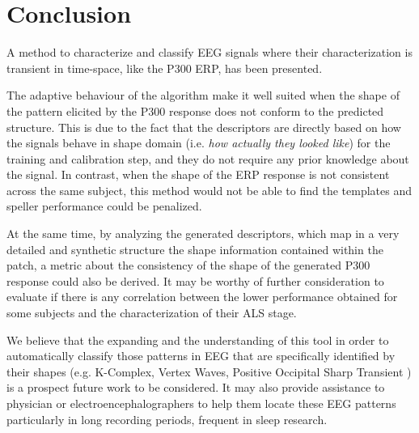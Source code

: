 \documentclass[entropy,article,submit,moreauthors,pdftex,10pt,a4paper]{mdpi}
\begin{document}
%
%
%
%
%
%
%
%

\section{Conclusion}

A method to characterize and classify EEG signals where their characterization is transient in time-space, like the P300 ERP, has been presented.   


The adaptive behaviour of the algorithm make it well suited when the shape of the pattern elicited by the P300 response does not conform to the predicted structure.  This is due to the fact that the descriptors are directly based on how the signals behave in shape domain (i.e. \textit{how actually they looked like}) for the training and calibration step, and they do not require any prior knowledge about the signal.   In contrast, when the shape of the ERP response is not consistent across the same subject, this method would not be able to find the templates and speller performance could be penalized.  

At the same time, by analyzing the generated descriptors, which map in a very detailed and synthetic structure the shape information contained within the patch, a metric about the consistency of the shape of the generated P300 response could also be derived.  It may be worthy of further consideration to evaluate if there is any correlation between the lower performance obtained for some subjects and the characterization of their ALS stage.

We believe that the expanding and the understanding of this tool in order to automatically classify those patterns in EEG that are specifically identified by their shapes (e.g. K-Complex, Vertex Waves, Positive Occipital Sharp Transient \citep{Hartman2005}) is a prospect future work to be considered.  It may also provide  assistance to physician or electroencephalographers to help them locate these EEG patterns particularly in long recording periods, frequent in sleep research.
\end{document}
